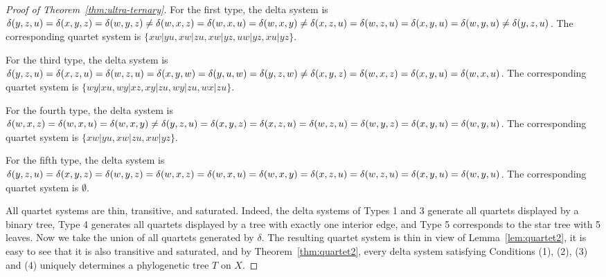\documentclass{article}
\begin{document}
\begin{proof}[Proof of Theorem~\ref{thm:ultra-ternary}]
For the first type, the delta system is 
$\delta(y,z,u)=\delta(x,y,z)=\delta(w,y,z)\neq 
\delta(w,x,z)\\
=\delta(w,x,u)=\delta(w,x,y)\neq \delta(x,z,u)=\delta(w,z,u)
=\delta(x,y,u)=\delta(w,y,u)\neq \delta(y,z,u)$. 
The corresponding quartet system is $\{xw|yu,xw|zu,xw|yz,uw|yz,xu|yz\}$.

For the third type, the delta system is 
$\delta(y,z,u)=\delta(x,z,u)=\delta(w,z,u)= 
\delta(x,y,w)\\
=\delta(y,u,w)=\delta(y,z,w)\neq \delta(x,y,z)=\delta(w,x,z)
=\delta(x,y,u)=\delta(w,x,u)$. 
The corresponding quartet system is $\{wy|xu,wy|xz,xy|zu,wy|zu,wx|zu\}$.

For the fourth type, the delta system is 
$\delta(w,x,z)=\delta(w,x,u)=\delta(w,x,y)\\
\neq 
\delta(y,z,u)=\delta(x,y,z)=\delta(x,z,u)= \delta(w,z,u)=\delta(w,y,z)
=\delta(x,y,u)=\delta(w,y,u)$. 
The corresponding quartet system is $\{xw|yu,xw|zu,xw|yz\}$.

For the fifth type, the delta system is 
$\delta(y,z,u)=\delta(x,y,z)=\delta(w,y,z)= 
\delta(w,x,z)\\
=\delta(w,x,u)=\delta(w,x,y)= \delta(x,z,u)=\delta(w,z,u)
=\delta(x,y,u)=\delta(w,y,u)$. 
The corresponding quartet system is $\emptyset$.

All quartet systems are thin, transitive, and saturated. Indeed, the delta systems 
of Types 1 and 3 generate all quartets displayed by a binary tree, Type 4 generates 
all quartets  displayed by a tree with exactly one interior edge, and Type 5 corresponds to the  
star tree with 5 leaves. Now we take the union of all quartets generated 
by $\delta$. The resulting quartet system is thin in view of Lemma~\ref{lem:quartet2},
it is easy to see that it is also transitive and saturated, and by Theorem~\ref{thm:quartet2}, 
every delta system satisfying Conditions (1), (2), (3) and (4) 
uniquely determines a phylogenetic tree $T$ on $X$. 


\end{proof}
\end{document}
